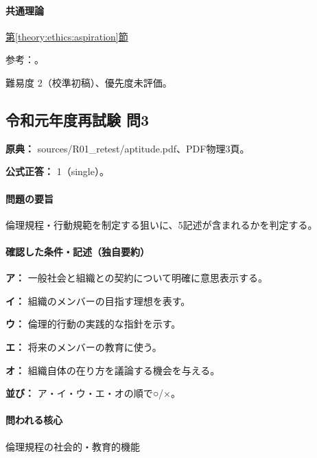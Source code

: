\paragraph{共通理論} \hyperref[theory:ethics:aspiration]{第\ref*{theory:ethics:aspiration}節}

\par 参考：\cite{jinji_ethics2017,jinji_ethics_qa,fudano_ethics2021}。

\par 難易度 2（校準初稿）、優先度未評価。

\subsection{令和元年度再試験 問3}
\label{q:r01-ret-apt-03}

\noindent\textbf{原典：} sources/R01\_retest/aptitude.pdf、PDF物理3頁。

\textbf{公式正答：} 1（single）。

\paragraph{問題の要旨} 倫理規程・行動規範を制定する狙いに、5記述が含まれるかを判定する。

\paragraph{確認した条件・記述（独自要約）}\mbox{}\par

\noindent\textbf{ア：} 一般社会と組織との契約について明確に意思表示する。\par

\noindent\textbf{イ：} 組織のメンバーの目指す理想を表す。\par

\noindent\textbf{ウ：} 倫理的行動の実践的な指針を示す。\par

\noindent\textbf{エ：} 将来のメンバーの教育に使う。\par

\noindent\textbf{オ：} 組織自体の在り方を議論する機会を与える。\par

\noindent\textbf{並び：} ア・イ・ウ・エ・オの順で○/×。\par

\paragraph{問われる核心} 倫理規程の社会的・教育的機能

